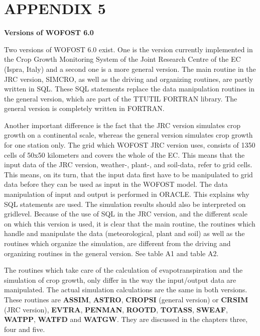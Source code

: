 \documentclass[11pt]{article}
\begin{document}
\setcounter{page}{129}\pagenumpos{\pnbr}
\section{  APPENDIX 5  }

\bigskip
{\bf {\large Versions of WO\-FOST 6.0}}

Two versions of WOFOST 6.0 exist. One is the version currently implemented in the
Crop Growth Monitoring System of the Joint Research Centre of the EC (Ispra, Italy) and
a second one is a more general version. The main routine in the JRC version, SIMCRO,
as well as the driving and organizing routines, are partly written in SQL. These SQL
statements replace the data manipula\-tion routines in the general version, which are part of
the TTUTIL FORTRAN library. The general version is completely written in FOR\-TRAN.

Another important difference is the fact that the JRC version simulates crop growth on a
continental scale, whereas the general version simulates crop growth for one station only.
The grid which WOFOST JRC version uses, consists of 1350 cells of 50x50 kilometers
and covers the whole of the EC. This means that the input data of the JRC ver\-{\nobreak}sion,
weather-, plant-, and soil-data, refer to grid cells. This means, on its turn, that the input
data first have to be manipulated to grid data before they can be used as input in the
WOFOST model. The data manipulation of input and output is performed in ORACLE.
This explains why SQL statements are used. The simulation results should also be
interpreted on gridlevel. Bec\-ause of the use of SQL in the JRC version, and the different
scale on which this version is used, it is clear that the main routine, the routines which
handle and manipulate the data (meteorological, plant and soil) as well as the routines
which organize the simulation, are different from the driving and organizing routines in
the general version. See table A1 and table A2. 

The routines which take care of the calculation of evapotranspiration and the simulation of
crop growth, only differ in the way the input/output data are manipulat\-ed. The actual
simulation calculations are the same in both versions. These routines are {\bf ASSIM},
{\bf ASTRO}, {\bf CROPSI} (general version) or {\bf CRSIM} (JRC version), {\bf EVTRA}, {\bf PENMAN},
{\bf ROOTD}, {\bf TOTASS}, {\bf SWEAF}, {\bf WATPP}, {\bf WATFD} and {\bf WATGW}. They are discussed in
the chapters three, four and five. 
\end{document}
